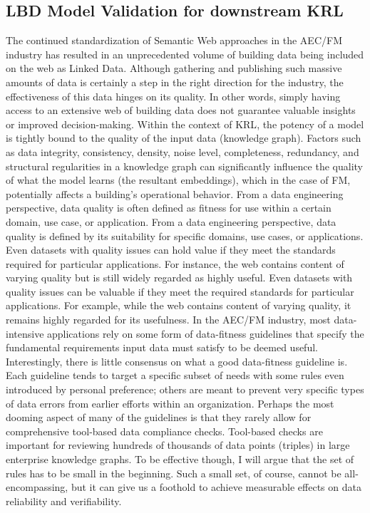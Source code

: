 \subsection{\ac{LBD} Model Validation for downstream \ac{KRL}}
The continued standardization of Semantic Web approaches in the \ac{AEC/FM} industry has resulted in an unprecedented volume of building data being included on the web as Linked Data. Although gathering and publishing such massive amounts of data is certainly a step in the right direction for the industry, the effectiveness of this data hinges on its quality. In other words, simply having access to an extensive web of building data does not guarantee valuable insights or improved decision-making. Within the context of \ac{KRL}, the potency of a model is tightly bound to the quality of the input data (knowledge graph). Factors such as data integrity, consistency, density, noise level, completeness, redundancy, and structural regularities in a knowledge graph can significantly influence the quality of what the model learns (the resultant embeddings), which in the case of \ac{FM}, potentially affects a building's operational behavior. From a data engineering perspective, data quality is often defined as fitness for use within a certain domain, use case, or application. From a data engineering perspective, data quality is defined by its suitability for specific domains, use cases, or applications. Even datasets with quality issues can hold value if they meet the standards required for particular applications. For instance, the web contains content of varying quality but is still widely regarded as highly useful. Even datasets with quality issues can be valuable if they meet the required standards for particular applications. For example, while the web contains content of varying quality, it remains highly regarded for its usefulness. In the AEC/FM industry, most data-intensive applications rely on some form of data-fitness guidelines that specify the fundamental requirements input data must satisfy to be deemed useful. Interestingly, there is little consensus on what a good data-fitness guideline is. Each guideline tends to target a specific subset of needs with some rules even introduced by personal preference; others are meant to prevent very specific types of data errors from earlier efforts within an organization. Perhaps the most dooming aspect of many of the guidelines is that they rarely allow for comprehensive tool-based data compliance checks. Tool-based checks are important for reviewing hundreds of thousands of data points (triples) in large enterprise knowledge graphs. To be effective though, I will argue that the set of rules has to be small in the beginning. Such a small set, of course, cannot be all-encompassing, but it can give us a foothold to achieve measurable effects on data reliability and verifiability. 

